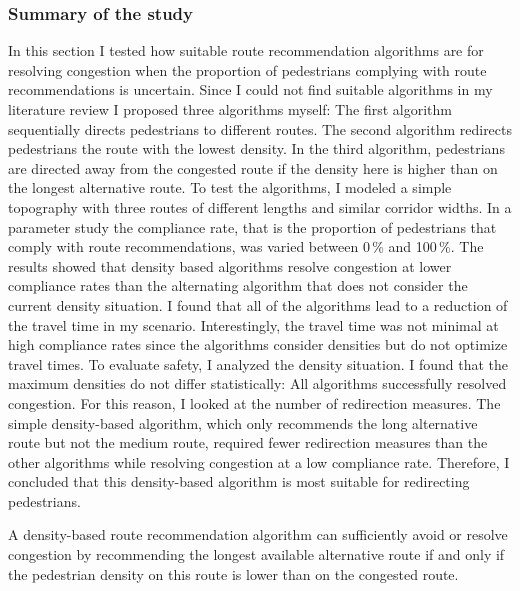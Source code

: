 \subsubsection{Summary of the study}
In this section I tested how suitable route recommendation algorithms are for resolving congestion when the proportion of pedestrians complying with route recommendations is uncertain. Since I could not find suitable algorithms in my literature review I proposed three algorithms myself: 
The first algorithm sequentially directs pedestrians to different routes. The second algorithm redirects pedestrians the route with the lowest density. 
In the third algorithm, pedestrians are directed away from the congested route if the density here is higher than on the longest  alternative route. To test the algorithms, I modeled a simple topography with three routes of different lengths and similar corridor widths. In a parameter study the compliance rate, that is the proportion of pedestrians that comply with route recommendations, was varied between 0\,\% and 100\,\%. The results showed that density based algorithms resolve congestion at lower compliance rates than the alternating algorithm that does not consider the current density situation. I found that all of the algorithms lead to a reduction of the travel time in my scenario. Interestingly, the travel time was not minimal at high compliance rates since the algorithms consider densities but do not optimize travel times. 
To evaluate safety, I analyzed the density situation. I found that the maximum densities do not differ statistically: All algorithms successfully resolved congestion. For this reason, I looked at the number of redirection measures. The simple density-based algorithm, which only recommends the long alternative route but not the medium route, required fewer redirection measures than the other algorithms while resolving congestion at a low compliance rate. Therefore, I concluded that this density-based algorithm is most suitable for redirecting pedestrians. 

\begin{tcolorbox}[title={Which algorithms are suitable for generating route recommendations for crowds, given not all people follow instructions? (RQ-2)}]
A density-based route recommendation algorithm can sufficiently avoid or resolve congestion by recommending the longest available alternative route if and only if the pedestrian density on this route is lower than on the congested route.
\end{tcolorbox}



